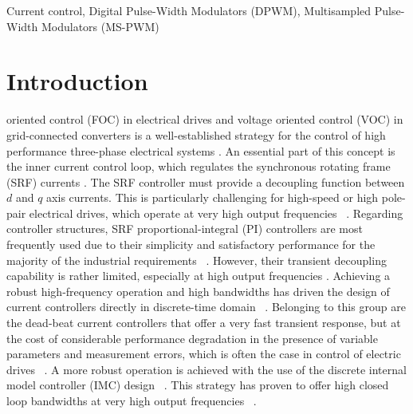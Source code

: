 \documentclass[conference]{IEEEtran}
\begin{document}
\begin{IEEEkeywords}
Current control, Digital Pulse-Width Modulators (DPWM), Multisampled Pulse-Width Modulators (MS-PWM)
\end{IEEEkeywords}


\IEEEpeerreviewmaketitle

\section{Introduction}
 oriented control (FOC) in electrical drives and voltage oriented control (VOC) in grid-connected converters is a well-established strategy for the control of high performance three-phase electrical systems \cite{holmes2012}. An essential part of this concept is the inner current control loop, which regulates the synchronous rotating frame (SRF) currents \cite{holmes2012}. The SRF controller must provide a decoupling function between $d$ and $q$ axis currents. This is particularly challenging for high-speed or high pole-pair electrical drives, which operate at very high output frequencies ~\cite{yim2009,Petric2021a}. 
Regarding controller structures, SRF proportional-integral (PI) controllers are most frequently used due to their simplicity and satisfactory performance for the majority of the industrial requirements ~\cite{yim2009,yepes2014}. However, their transient decoupling capability is rather limited, especially at high output frequencies \cite{lorenz2010}. Achieving a robust high-frequency operation and high bandwidths has driven the design of current controllers directly in discrete-time domain ~\cite{lorenz2010,vuksa2016,commentsHoffmann}. Belonging to this group are the dead-beat current controllers that offer a very fast transient response, but at the cost of considerable performance degradation in the presence of variable parameters and measurement errors, which is often the case in control of electric drives ~\cite{rovere2018,xu2019,Ito2021}. A more robust operation is achieved with the use of the discrete internal model controller (IMC) design ~\cite{lorenz2010,vuksa2016,commentsHoffmann}. This strategy has proven to offer high closed loop bandwidths at very high output frequencies ~\cite{commentsHoffmann,vuksa2016,Petric2021a}.
\end{document}
